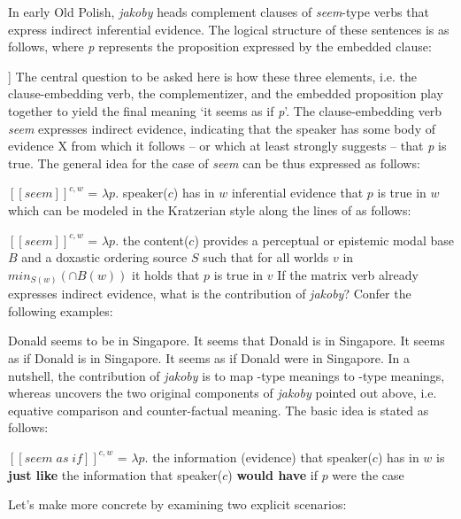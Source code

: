 \documentclass[output=paper
,modfonts
,nonflat]{langsci/langscibook}
\begin{document}
\noindent In early Old Polish, \emph{jakoby} heads complement clauses of \emph{seem}-type verbs that express indirect inferential evidence. The logical structure of these sentences is as follows, where \emph{p} represents the proposition expressed by the embedded clause:

\ea\relax [\emph{seem} [\emph{jakoby} \emph{p}]]  \z
The central question to be asked here is how these three elements, i.e. the clause-embedding verb, the complementizer, and the embedded proposition play together to yield the final meaning `it seems as if \emph{p}'. The clause-embedding verb \emph{seem} expresses indirect evidence, indicating that the speaker has some body of evidence X from which it follows – or which at least strongly suggests – that \emph{p} is true. The general idea for the case of \emph{seem} can be thus expressed as follows:

\ea	\([\![seem]\!]^{c,w}\) =  \( \lambda p . \) speaker(\( c \)) has in \( w \) inferential evidence that \( p \) is true in \( w \) \z
which can be modeled in the Kratzerian style along the lines of \textcite{Faller2011} as follows:

\ea	\([\![seem]\!]^{c,w}\) =  \( \lambda p . \) the content(\( c \)) provides a perceptual or epistemic modal base \( B \) and a doxastic ordering source \( S \) such that for all worlds \( v \) in \( min_{S(w)} (\cap B(w))\) it holds that \( p \) is true in \( v \)       \z If the matrix verb already expresses indirect evidence, what is the contribution of \emph{jakoby}? Confer the following examples:

\ea	\ea	Donald seems to be in Singapore. \label{Donald3}
	\ex	It seems that Donald is in Singapore. \label{Donald}
	\ex	It seems as if Donald is in Singapore.
	\ex	It seems as if Donald were in Singapore. \label{Donald2}
\z
\z In a nutshell, the contribution of \emph{jakoby} is to map -type meanings to -type meanings, whereas   uncovers the two original components of \emph{jakoby} pointed out above, i.e. equative comparison and counter-factual meaning. The basic idea is stated as follows:

\ea\([\![seem \; as \; if]\!]^{c,w}\) =  \( \lambda p . \) the information (evidence) that speaker(\( c \)) has in \( w \) is \textbf{just like} the information that speaker(\( c \)) \textbf{would have} if \( p \) were the case \label{counter}\z

\noindent Let's make  more concrete by examining two explicit scenarios:
\end{document}
